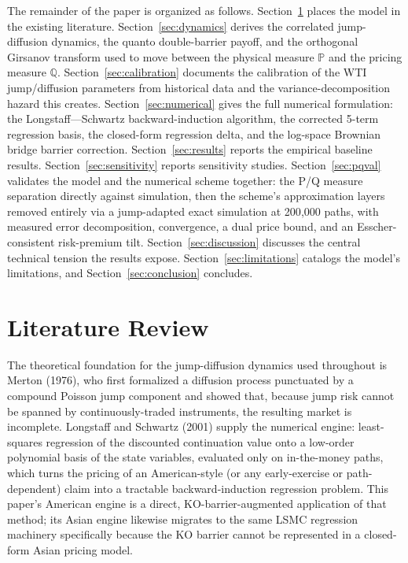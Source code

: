 \documentclass[11pt,a4paper]{article}
\begin{document}
The remainder of the paper is organized as follows. Section~\ref{sec:litreview} places the model in the existing literature. Section~\ref{sec:dynamics} derives the correlated jump-diffusion dynamics, the quanto double-barrier payoff, and the orthogonal Girsanov transform used to move between the physical measure $\mathbb{P}$ and the pricing measure $\mathbb{Q}$. Section~\ref{sec:calibration} documents the calibration of the WTI jump/diffusion parameters from historical data and the variance-decomposition hazard this creates. Section~\ref{sec:numerical} gives the full numerical formulation: the Longstaff---Schwartz backward-induction algorithm, the corrected 5-term regression basis, the closed-form regression delta, and the log-space Brownian bridge barrier correction. Section~\ref{sec:results} reports the empirical baseline results. Section~\ref{sec:sensitivity} reports sensitivity studies. Section~\ref{sec:pqval} validates the model and the numerical scheme together: the P/Q measure separation directly against simulation, then the scheme's approximation layers removed entirely via a jump-adapted exact simulation at 200{,}000 paths, with measured error decomposition, convergence, a dual price bound, and an Esscher-consistent risk-premium tilt. Section~\ref{sec:discussion} discusses the central technical tension the results expose. Section~\ref{sec:limitations} catalogs the model's limitations, and Section~\ref{sec:conclusion} concludes.

\section{Literature Review}
\label{sec:litreview}

The theoretical foundation for the jump-diffusion dynamics used throughout is Merton (1976), who first formalized a diffusion process punctuated by a compound Poisson jump component and showed that, because jump risk cannot be spanned by continuously-traded instruments, the resulting market is incomplete. Longstaff and Schwartz (2001) supply the numerical engine: least-squares regression of the discounted continuation value onto a low-order polynomial basis of the state variables, evaluated only on in-the-money paths, which turns the pricing of an American-style (or any early-exercise or path-dependent) claim into a tractable backward-induction regression problem. This paper's American engine is a direct, KO-barrier-augmented application of that method; its Asian engine likewise migrates to the same LSMC regression machinery specifically because the KO barrier cannot be represented in a closed-form Asian pricing model.
\end{document}
